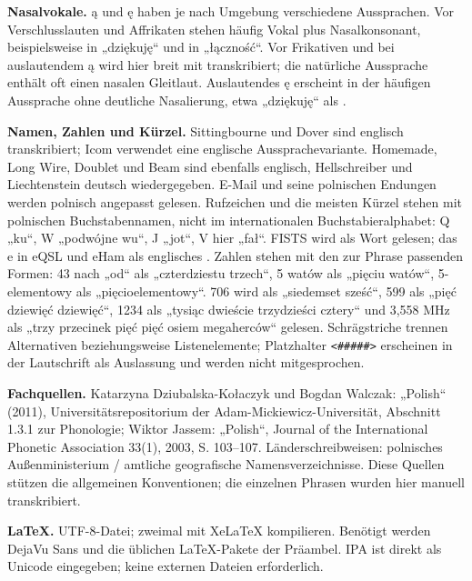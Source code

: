 \documentclass[a4paper,landscape,10pt]{article}
\newcommand{\ipa}[1]{{\ipafont[#1]}}
\begin{document}
\smallskip
\textbf{Nasalvokale.} ą und ę haben je nach Umgebung verschiedene Aussprachen. Vor Verschlusslauten
und Affrikaten stehen häufig Vokal plus Nasalkonsonant, beispielsweise \ipa{ɛŋ} in „dziękuję“ und
\ipa{ɔntʂ} in „łączność“. Vor Frikativen und bei auslautendem ą wird hier breit mit \ipa{ɛ̃, ɔ̃}
transkribiert; die natürliche Aussprache enthält oft einen nasalen Gleitlaut. Auslautendes ę erscheint
in der häufigen Aussprache ohne deutliche Nasalierung, etwa „dziękuję“ als \ipa{dʑɛŋˈkujɛ}.


\smallskip
\textbf{Namen, Zahlen und Kürzel.} Sittingbourne und Dover sind englisch transkribiert;
Icom verwendet eine englische Aussprachevariante. Homemade, Long Wire, Doublet und Beam sind ebenfalls
englisch, Hellschreiber und Liechtenstein deutsch wiedergegeben. E-Mail und seine polnischen Endungen
werden polnisch angepasst gelesen. Rufzeichen und die meisten Kürzel stehen mit polnischen Buchstabennamen,
nicht im internationalen Buchstabieralphabet: Q „ku“, W „podwójne wu“, J „jot“, V hier „fał“.
FISTS wird als Wort gelesen; das e in eQSL und eHam als englisches \ipa{i}.
Zahlen stehen mit den zur Phrase passenden Formen: 43 nach „od“ als „czterdziestu trzech“,
5 watów als „pięciu watów“, 5-elementowy als „pięcioelementowy“. 706 wird als „siedemset sześć“,
599 als „pięć dziewięć dziewięć“, 1234 als „tysiąc dwieście trzydzieści cztery“ und
3,558 MHz als „trzy przecinek pięć pięć osiem megaherców“ gelesen.
Schrägstriche trennen Alternativen beziehungsweise Listenelemente; Platzhalter \texttt{<\#\#\#\#\#>}
erscheinen in der Lautschrift als Auslassung und werden nicht mitgesprochen.

\smallskip
\textbf{Fachquellen.} Katarzyna Dziubalska-Kołaczyk und Bogdan Walczak: „Polish“ (2011),
Universitätsrepositorium der Adam-Mickiewicz-Universität, Abschnitt 1.3.1 zur Phonologie;
Wiktor Jassem: „Polish“, Journal of the International Phonetic Association 33(1), 2003, S. 103--107.
Länderschreibweisen: polnisches Außenministerium / amtliche geografische Namensverzeichnisse.
Diese Quellen stützen die allgemeinen Konventionen; die einzelnen Phrasen wurden hier manuell transkribiert.

\smallskip
\textbf{LaTeX.} UTF-8-Datei; zweimal mit XeLaTeX kompilieren. Benötigt werden DejaVu Sans und die
üblichen LaTeX-Pakete der Präambel. IPA ist direkt als Unicode eingegeben; keine externen Dateien erforderlich.
\end{document}
